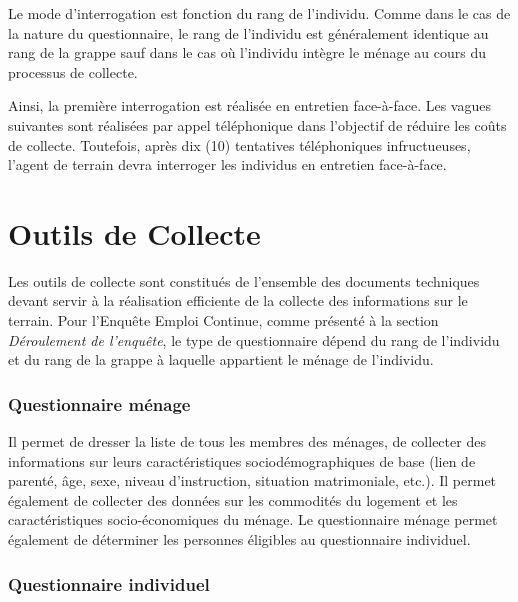 \documentclass[12pt, a4paper]{article}
\begin{document}
Le mode d'interrogation est fonction du rang de l'individu. Comme dans le cas de la nature du questionnaire, le rang de l'individu est généralement identique au rang de la grappe sauf dans le cas où l'individu intègre le ménage au cours du processus de collecte.

Ainsi, la première interrogation est réalisée en entretien face-à-face. Les vagues suivantes sont réalisées par appel téléphonique dans l'objectif de réduire les coûts de collecte. Toutefois, après dix (10) tentatives téléphoniques infructueuses, l'agent de terrain devra interroger les individus en entretien face-à-face.

\section{Outils de Collecte}

Les outils de collecte sont constitués de l'ensemble des documents techniques devant servir à la réalisation efficiente de la collecte des informations sur le terrain. Pour l'Enquête Emploi Continue, comme présenté à la section \textit{Déroulement de l'enquête}, le type de questionnaire dépend du rang de l'individu et du rang de la grappe à laquelle appartient le ménage de l'individu.

\subsubsection*{Questionnaire ménage}

Il permet de dresser la liste de tous les membres des ménages, de collecter des informations sur leurs caractéristiques sociodémographiques de base (lien de parenté, âge, sexe, niveau d'instruction, situation matrimoniale, etc.). Il permet également de collecter des données sur les commodités du logement et les caractéristiques socio-économiques du ménage. Le questionnaire ménage permet également de déterminer les personnes éligibles au questionnaire individuel.

\subsubsection*{Questionnaire individuel}
\end{document}
